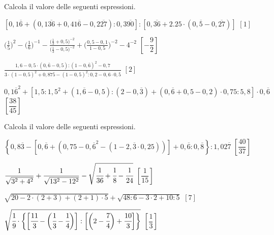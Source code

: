 \begin{esercizio}[\Ast]
\label{ese:3.156}
 Calcola il valore delle seguenti espressioni.
\begin{enumeratea}
\spazielenx
\item \(\displaystyle{\left[0,1\overline{6}+(0,1\overline{36}+0,41
\overline{6}-0,2\overline{27}):0,3\overline{90}\right]:%
\left[0,\overline{36}+2.25\cdot(0,\overline{5}-0,\overline{27})\right]}\)
  \hfill \(\left[1 \right]\)
\item \(\displaystyle{\bigg(\frac{1}{5}\bigg)^{2}-\bigg(\frac{1}{6}
\bigg)^{-1}-\frac{\bigg(\frac{1}{3}+0,5\bigg)^{-2}}%
{\bigg(\frac{1}{3}-0,5\bigg)^{-2}}+\bigg(\frac{0,5-0,1}{1-0,5}
\bigg)^{-2}-4^{-2}}\)
  \hfill \(\left[-\dfrac{9}{2} \right]\)
\item \(\displaystyle{\frac{1,6-0,5\cdot(0,\overline{6}-0,5):(1-0,
\overline{6})^{2}-0,7}%
{3\cdot(1-0,5)^{2}+0,875-(1-0,5)^{2}:0,2-0,6\cdot0,5}}\)
  \hfill \(\left[2 \right]\)
\item \(\displaystyle{{0,1\overline{6}}^{2}+\left[1,5:1,5^{2}+\left(1,
\overline{6}-0,5\right):\left(2-0,\overline{3}\right)%
+\left(0,\overline{6}+0,5-0,2\right)\cdot0,75:5,8\right]\cdot 0,
\overline{6}}\)
  \hfill \(\left[\dfrac{38}{45} \right]\)
\end{enumeratea}
\end{esercizio}

\begin{esercizio}[\Ast]
\label{ese:3.157}
 Calcola il valore delle seguenti espressioni.
\begin{enumeratea}
\spazielenx
\item \(\displaystyle{\left\{0,8\overline{3}-\left[0,\overline{6}+(0,75-{0,
\overline{6}}^{2}-(1-2,\overline{3}\cdot%
0,25))\right]+0,\overline{6}:0,\overline{8}\right\}:1,02\overline{7}}\)
  \hfill \(\left[\dfrac{40}{37} \right]\)
\item 
\(\displaystyle{\frac{1}{\sqrt{3^{2}+4^{2}}}+\frac{1}{\sqrt{13^{2}-12^2}}-
\sqrt{\cfrac{1}{36}+\cfrac{1}{8}%
-\cfrac{1}{24}}}\)
  \hfill \(\left[\dfrac{1}{15} \right]\)
\item \(\displaystyle{\sqrt{20-2\cdot(2+3)+(2+1)\cdot5}+\sqrt{48:6-3
\cdot2+10:5}}\)
  \hfill \(\left[7 \right]\)
\item \(\displaystyle{\sqrt{\cfrac{1}{9}\cdot\bigg\{\bigg[\cfrac{11}{3}-
\bigg(\cfrac{1}{3}-\cfrac{1}{4}\bigg)\bigg]:%
\bigg[\bigg(2-\cfrac{7}{4}\bigg)+\cfrac{10}{3}\bigg]\bigg\}}}\)
  \hfill \(\left[\dfrac{1}{3} \right]\)
\end{enumeratea}
\end{esercizio}

